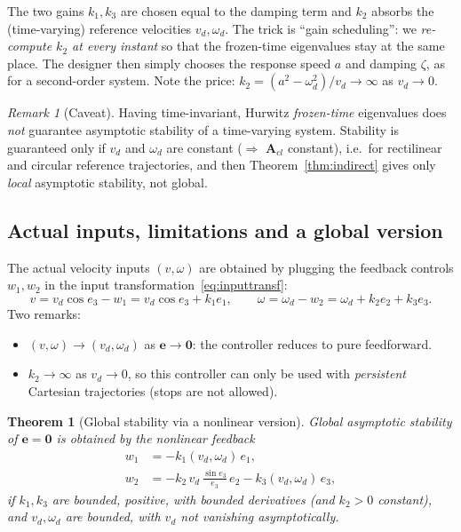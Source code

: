 \documentclass[11pt,a4paper]{article}
\newcommand{\vect}[1]{\bm{#1}}
\newcommand{\vd}{v_d}
\newcommand{\omd}{\omega_d}
\newcommand{\Acl}{\vect{A}_{cl}}
\theoremstyle{plain}
\newtheorem{theorem}{Theorem}[section]
\theoremstyle{definition}
\theoremstyle{remark}
\newtheorem*{remark}{Remark}
\begin{document}
\begin{intuition}
The two gains $k_1,k_3$ are chosen equal to the damping term and $k_2$ absorbs the (time-varying) reference velocities $\vd,\omd$. The trick is ``gain scheduling'': we \emph{re-compute $k_2$ at every instant} so that the frozen-time eigenvalues stay at the same place. The designer then simply chooses the response speed $a$ and damping $\zeta$, as for a second-order system. Note the price: $k_2=(a^2-\omd^2)/\vd\to\infty$ as $\vd\to0$.
\end{intuition}

\begin{remark}[Caveat]
Having time-invariant, Hurwitz \emph{frozen-time} eigenvalues does \emph{not} guarantee asymptotic stability of a time-varying system. Stability is guaranteed only if $\vd$ and $\omd$ are constant ($\Rightarrow$ $\Acl$ constant), i.e.\ for rectilinear and circular reference trajectories, and then Theorem~\ref{thm:indirect} gives only \emph{local} asymptotic stability, not global.
\end{remark}

\subsection{Actual inputs, limitations and a global version}

The actual velocity inputs $(v,\omega)$ are obtained by plugging the feedback controls $w_1,w_2$ in the input transformation~\eqref{eq:inputtransf}:
\begin{equation}\label{eq:actualinputs}
v=\vd\cos e_3-w_1=\vd\cos e_3+k_1e_1,\qquad
\omega=\omd-w_2=\omd+k_2e_2+k_3e_3 .
\end{equation}
Two remarks:
\begin{itemize}[nosep]
\item $(v,\omega)\to(\vd,\omd)$ as $\vect e\to\vect 0$: the controller reduces to pure feedforward.
\item $k_2\to\infty$ as $\vd\to0$, so this controller can only be used with \emph{persistent} Cartesian trajectories (stops are not allowed).
\end{itemize}

\begin{theorem}[Global stability via a nonlinear version]\label{thm:nonlin}
Global asymptotic stability of $\vect e=\vect 0$ is obtained by the nonlinear feedback
\begin{align}
w_1&=-k_1(\vd,\omd)\,e_1,\\
w_2&=-k_2\,\vd\,\frac{\sin e_3}{e_3}\,e_2-k_3(\vd,\omd)\,e_3,
\end{align}
if $k_1,k_3$ are bounded, positive, with bounded derivatives (and $k_2>0$ constant), and $\vd,\omd$ are bounded, with $\vd$ not vanishing asymptotically.
\end{theorem}
\end{document}
